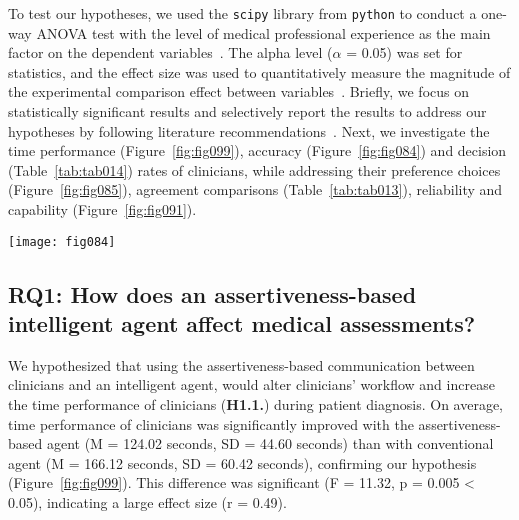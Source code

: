 To test our hypotheses, we used the \texttt{scipy} library from \texttt{python} to conduct a one-way \ac{ANOVA} test with the level of medical professional experience as the main factor on the dependent variables~\cite{CASALE2022107302}.
The alpha level ($\alpha$ = 0.05) was set for statistics, and the effect size was used to quantitatively measure the magnitude of the experimental comparison effect between variables~\cite{Yigit_Mendes_2018, 10.1145/3180155.3182556}.
Briefly, we focus on statistically significant results and selectively report the results to address our hypotheses by following literature recommendations~\cite{10.1145/3301275.3302289, 10.1145/3290605.3300234, 10.1145/3491102.3517791}.
Next, we investigate the time performance (Figure~\ref{fig:fig099}), accuracy (Figure~\ref{fig:fig084}) and decision (Table~\ref{tab:tab014}) rates of clinicians, while addressing their preference choices (Figure~\ref{fig:fig085}), agreement comparisons (Table~\ref{tab:tab013}), reliability and capability (Figure~\ref{fig:fig091}).

\begin{figure*}[htpb]
\centering
\texttt{[image: fig084]}
\caption[]{Accuracy rates using a confusion matrix. Comparison between the clinician's BIRADS classification (from 1 to 5) of a patient while using both conventional (left) and assertiveness-based (right) agents. Columns are representing the {\it Predicted} value (collaboration between the clinician and AI), and the rows are representing the {\it Actual} category (biopsy confirmed).}
\label{fig:fig084}
\end{figure*}

\subsection{RQ1: How does an assertiveness-based intelligent agent affect medical assessments?}
\label{sec:chap006006001}

We hypothesized that using the assertiveness-based communication between clinicians and an intelligent agent, would alter clinicians' workflow and increase the time performance of clinicians ({\bf H1.1.}) during patient diagnosis.
On average, time performance of clinicians was significantly improved with the assertiveness-based agent (M = 124.02 seconds, SD = 44.60 seconds) than with conventional agent (M = 166.12 seconds, SD = 60.42 seconds), confirming our hypothesis (Figure~\ref{fig:fig099}).
This difference was significant (F = 11.32, p = 0.005 < 0.05), indicating a large effect size (r = 0.49).

